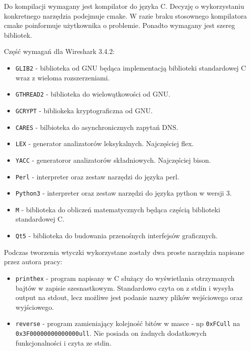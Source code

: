 \documentclass[a4paper, 12pt, twoside, openright]{article}
\begin{document}
	Do kompilacji wymagany jest kompilator do języka C. Decyzję o wykorzystaniu konkretnego narzędzia podejmuje cmake.
	W razie braku stosownego kompilatora cmake poinformuje użytkownika o problemie. Ponadto wymagany jest szereg
	bibliotek.

	\newpage

	Część wymagań dla Wireshark 3.4.2:
	\begin{itemize}
		\item \texttt{GLIB2} - biblioteka od GNU będąca implementacją biblioteki standardowej C wraz z wieloma rozszerzeniami.
		\item \texttt{GTHREAD2} - biblioteka do wielowątkowości od GNU.
		\item \texttt{GCRYPT} - bibliokeka kryptograficzna od GNU.
		\item \texttt{CARES} - bilbioteka do asynchronicznych zapytań DNS.
		\item \texttt{LEX} - generator analizatorów leksykalnych. Najczęściej flex.
		\item \texttt{YACC} - generatoror analizatorów składniowych. Najczęściej bison.
		\item \texttt{Perl} - interpreter oraz zestaw narzędzi do języka perl.
		\item \texttt{Python3} - interpreter oraz zestaw narzędzi do języka python w wersji 3.
		\item \texttt{M} - biblioteka do obliczeń matematycznych będąca częścią biblioteki standardowej C.
		\item \texttt{Qt5} - biblioteka do budowania przenośnych interfejsów graficznych.
	\end{itemize}

	\indent\par
	Podczas tworzenia wtyczki wykorzystane zostały dwa proste narzędzia napisane przez autora pracy:
	\begin{itemize}
		\item \texttt{printhex} - program napisany w C służący do wyświetlania otrzymanych bajtów w zapisie szesnastkowym. Standardowo
			czyta on z stdin i wysyła output na stdout, lecz możliwe jest podanie nazwy plików wejściowego oraz wyjściowego.
		\item \texttt{reverse} - program zamieniający kolejność bitów w masce - np \texttt{0xFCull} na \texttt{0x3F00000000000000ull}.
			Nie posiada on żadnych dodatkowych funkcjonalności i czyta ze stdin.
	\end{itemize}
\end{document}
